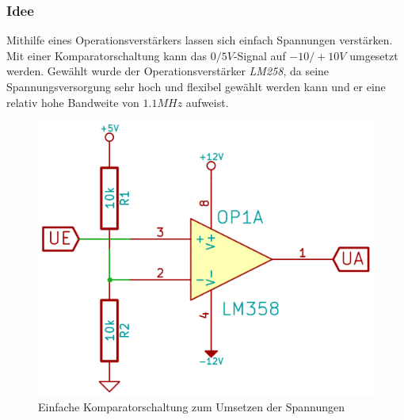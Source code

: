 \subsubsection{Idee} %
Mithilfe eines Operationsverstärkers lassen sich einfach Spannungen verstärken. Mit einer Komparatorschaltung kann das $0/5V$-Signal auf $-10/+10V$ umgesetzt werden. Gewählt wurde der Operationsverstärker \textit{LM258}, da seine Spannungsversorgung sehr hoch und flexibel gewählt werden kann und er eine relativ hohe Bandweite von $1.1MHz$ aufweist.
\begin{figure}[H]
\centering
\includegraphics[scale=0.5]{images/komparatorschaltung.jpg}
\caption{Einfache Komparatorschaltung zum Umsetzen der Spannungen} \label{img:I1} %
\end{figure}

